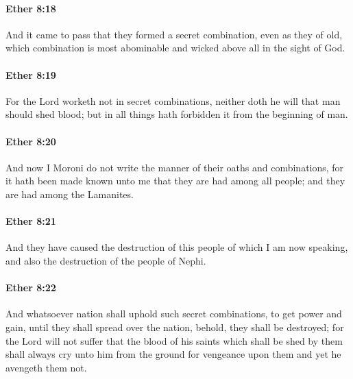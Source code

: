 		\paragraph{Ether 8:18} %
			\label{ETHER-8-18}

			And it came to pass that they formed a secret combination,
			even as they of old,
			which combination is most abominable and wicked above all in the sight of God.

		\paragraph{Ether 8:19} %
			\label{ETHER-8-19}

			For the Lord worketh not in secret combinations,
			neither doth he will that man should shed blood;
			but in all things hath forbidden it from the beginning of man.

		\paragraph{Ether 8:20} %
			\label{ETHER-8-20}

			And now I Moroni do not write the manner of their oaths and combinations,
			for it hath been made known unto me that they are had among all people;
			and they are had among the Lamanites.

		\paragraph{Ether 8:21} %
			\label{ETHER-8-21}

			And they have caused the destruction of this people of which I am now speaking,
			and also the destruction of the people of Nephi.

		\paragraph{Ether 8:22} %
			\label{ETHER-8-22}

			And whatsoever nation shall uphold such secret combinations,
			to get power and gain,
			until they shall spread over the nation,
			behold, they shall be destroyed;
			for the Lord will not suffer
			that the blood of his saints which shall be shed by them
			shall always cry unto him from the ground for vengeance upon them
			and yet he avengeth them not.

